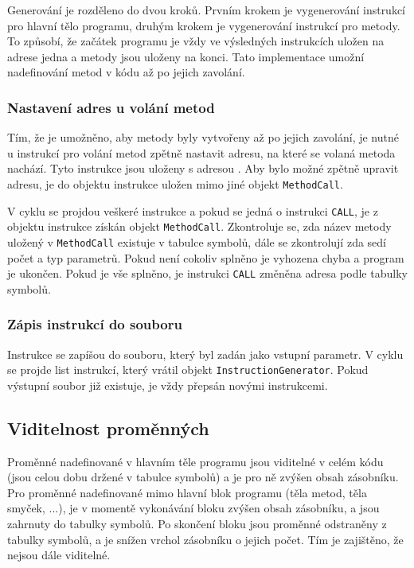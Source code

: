 \documentclass[12pt, a4paper]{article}
\begin{document}
Generování je rozděleno do dvou kroků. Prvním krokem je vygenerování instrukcí pro hlavní tělo programu, druhým krokem je vygenerování instrukcí pro metody. To způsobí, že začátek programu je vždy ve výsledných instrukcích uložen na adrese jedna a metody jsou uloženy na konci. Tato implementace umožní nadefinování metod v kódu až po jejich zavolání.

\subsubsection{Nastavení adres u volání metod}
\noindent Tím, že je umožněno, aby metody byly vytvořeny až po jejich zavolání, je nutné u instrukcí pro volání metod zpětně nastavit adresu, na které se volaná metoda nachází. Tyto instrukce jsou uloženy s adresou . Aby bylo možné zpětně upravit adresu, je do objektu instrukce uložen mimo jiné objekt \texttt{MethodCall}.

V cyklu se projdou veškeré instrukce a pokud se jedná o instrukci \texttt{CALL}, je z objektu instrukce získán objekt \texttt{MethodCall}. Zkontroluje se, zda název metody uložený v \texttt{MethodCall} existuje v tabulce symbolů, dále se zkontrolují zda sedí počet a typ parametrů. Pokud není cokoliv splněno je vyhozena chyba a program je ukončen. Pokud je vše splněno, je instrukci \texttt{CALL} změněna adresa podle tabulky symbolů.

\subsubsection{Zápis instrukcí do souboru}
Instrukce se zapíšou do souboru, který byl zadán jako vstupní parametr. V cyklu se projde list instrukcí, který vrátil objekt \texttt{InstructionGenerator}. Pokud výstupní soubor již existuje, je vždy přepsán novými instrukcemi.

\subsection{Viditelnost proměnných}
\noindent Proměnné nadefinované v hlavním těle programu jsou viditelné v celém kódu (jsou celou dobu držené v tabulce symbolů) a je pro ně zvýšen obsah zásobníku. Pro proměnné nadefinované mimo hlavní blok programu (těla metod, těla smyček, ...), je v momentě vykonávání bloku zvýšen obsah zásobníku, a jsou zahrnuty do tabulky symbolů. Po skončení bloku jsou proměnné odstraněny z tabulky symbolů, a je snížen vrchol zásobníku o jejich počet. Tím je zajištěno, že nejsou dále viditelné.
\end{document}
